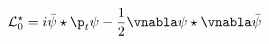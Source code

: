 \begin{equation}
     {\cal L}_{0}^\star
     =i\bar{\psi}\star\p_{t}\psi-
     \frac{1}{2}\vnabla\psi\star\vnabla\bar{\psi}
     \label{staraction}
\end{equation}

